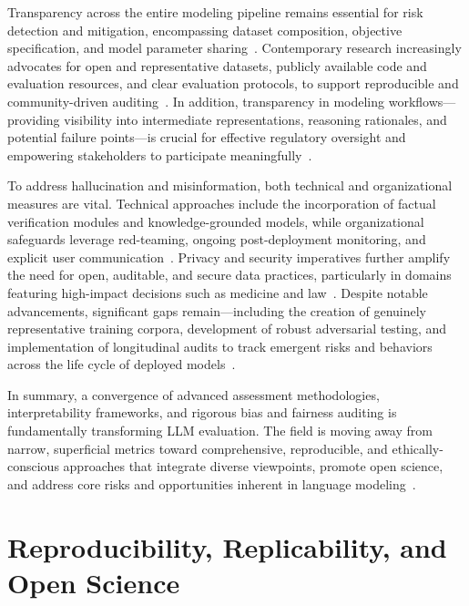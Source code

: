 \documentclass[sigconf]{acmart}
\begin{document}
Transparency across the entire modeling pipeline remains essential for risk detection and mitigation, encompassing dataset composition, objective specification, and model parameter sharing~\cite{ref14, ref36, ref46, ref65, ref73}. Contemporary research increasingly advocates for open and representative datasets, publicly available code and evaluation resources, and clear evaluation protocols, to support reproducible and community-driven auditing~\cite{ref1, ref36, ref44, ref49, ref65, ref73}. In addition, transparency in modeling workflows---providing visibility into intermediate representations, reasoning rationales, and potential failure points---is crucial for effective regulatory oversight and empowering stakeholders to participate meaningfully~\cite{ref14, ref45, ref46, ref49, ref52, ref65}.

To address hallucination and misinformation, both technical and organizational measures are vital. Technical approaches include the incorporation of factual verification modules and knowledge-grounded models, while organizational safeguards leverage red-teaming, ongoing post-deployment monitoring, and explicit user communication~\cite{ref3, ref10, ref21, ref42, ref43, ref65}. Privacy and security imperatives further amplify the need for open, auditable, and secure data practices, particularly in domains featuring high-impact decisions such as medicine and law~\cite{ref14, ref36, ref42, ref46, ref53, ref65}. Despite notable advancements, significant gaps remain---including the creation of genuinely representative training corpora, development of robust adversarial testing, and implementation of longitudinal audits to track emergent risks and behaviors across the life cycle of deployed models~\cite{ref21, ref22, ref23, ref42, ref65, ref73}.

In summary, a convergence of advanced assessment methodologies, interpretability frameworks, and rigorous bias and fairness auditing is fundamentally transforming LLM evaluation. The field is moving away from narrow, superficial metrics toward comprehensive, reproducible, and ethically-conscious approaches that integrate diverse viewpoints, promote open science, and address core risks and opportunities inherent in language modeling~\cite{ref1, ref3, ref10, ref14, ref19, ref35, ref36, ref43, ref45, ref46, ref49, ref52, ref65, ref73, ref76, ref81, ref83, ref84, ref85, ref91, ref94, ref95, ref101, ref104, ref106, ref108}.

\section{Reproducibility, Replicability, and Open Science}
\end{document}
